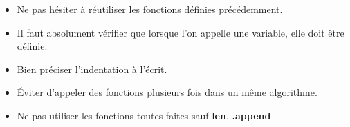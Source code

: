 \begin{itemize}
\item Ne pas hésiter à réutiliser les fonctions définies précédemment.
\item Il faut absolument vérifier que lorsque l'on appelle une variable, elle doit être définie.
\item Bien préciser l'indentation à l'écrit.
\item Éviter d'appeler des fonctions plusieurs fois dans un même algorithme.
\item Ne pas utiliser les fonctions toutes faites sauf \textbf{len}, \textbf{.append}
\end{itemize}

